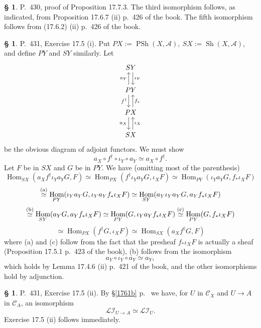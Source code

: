 \documentclass[12pt]{article}
\theoremstyle{remark}
\theoremstyle{definition}
\newtheorem{s}[thm]{\S}
\newcommand{\cc}{\mathcal}
\newcommand{\oo}{\operatorname}
\newcommand{\A}{\mathcal A}
\newcommand{\C}{\mathcal C}
\DeclareMathOperator{\Hom}{Hom}
\begin{document}
%

\begin{s} 
P.~430, proof of Proposition 17.7.3. The third isomorphism follows, as indicated, from Proposition 17.6.7 (ii) p.~426 of the book. The fifth isomorphism follows from (17.6.2) (ii) p.~426 of the book. 
\end{s} 

%

\begin{s}\label{175i}
P.~431, Exercise 17.5 (i). Put $PX:=\oo{PSh}(X,\A),\ SX:=\oo{Sh}(X,\A)$, and define $PY$ and $SY$ similarly. Let
$$
\begin{tikzcd} 
SY\ar[xshift=0.7ex]{d}{\iota_Y}\\ 
PY\ar[xshift=-0.7ex]{u}{a_Y}\ar[xshift=-0.7ex]{d}[swap]{f^\dagger}\\ 
PX\ar[xshift=0.7ex]{u}[swap]{f_*}\ar[xshift=-0.7ex]{d}[swap]{a_X}\\ 
SX\ar[xshift=0.7ex]{u}[swap]{\iota_X}
\end{tikzcd}
$$ 
be the obvious diagram of adjoint functors. We must show 
$$
a_X\circ f^\dagger\circ \iota_Y\circ a_Y\simeq a_X\circ f^\dagger. 
$$ 
Let $F$ be in $SX$ and $G$ be in $PY$. We have (omitting most of the parenthesis) 
$$
\Hom_{SX}(a_Xf^\dagger\iota_Ya_YG,F)\simeq
\Hom_{PX}(f^\dagger\iota_Ya_YG,\iota_XF)\simeq
\Hom_{PY}(\iota_Ya_YG,f_*\iota_XF)
$$
$$
\overset{(\text a)}{\simeq}
\Hom_{PY}(\iota_Ya_YG,\iota_Ya_Yf_*\iota_XF)\simeq
\Hom_{SY}(a_Y\iota_Ya_YG,a_Yf_*\iota_XF)
$$
$$
\overset{(\text b)}{\simeq}
\Hom_{SY}(a_YG,a_Yf_*\iota_XF)\simeq
\Hom_{PY}(G,\iota_Ya_Yf_*\iota_XF)\overset{(\text c)}{\simeq}
\Hom_{PY}(G,f_*\iota_XF)
$$ 
$$ 
\simeq 
\Hom_{PX}(f^\dagger G,\iota_XF)\simeq 
\Hom_{SX}(a_Xf^\dagger G,F)
$$ 
where (a) and (c) follow from the fact that the presheaf $f_*\iota_XF$ is actually a sheaf (Proposition 17.5.1 p.~423 of the book), (b) follows from the isomorphism 
$$
a_Y\circ \iota_Y\circ a_Y\simeq a_Y,
$$ 
which holds by Lemma 17.4.6 (ii) p.~421 of the book, and the other isomorphisms hold by adjunction. 
\end{s} 

%

\begin{s} 
P.~431, Exercise 17.5 (ii). By \S\ref{1761b} p.~\pageref{1761b} we have, for $U$ in $\C_X$ and $U\to A$ in $\C_A$, an isomorphism 
$$
\cc{LI}_{U\to A}\simeq\cc{LI}_U.
$$
Exercise 17.5 (ii) follows immediately. 
\end{s} 

\end{document}
